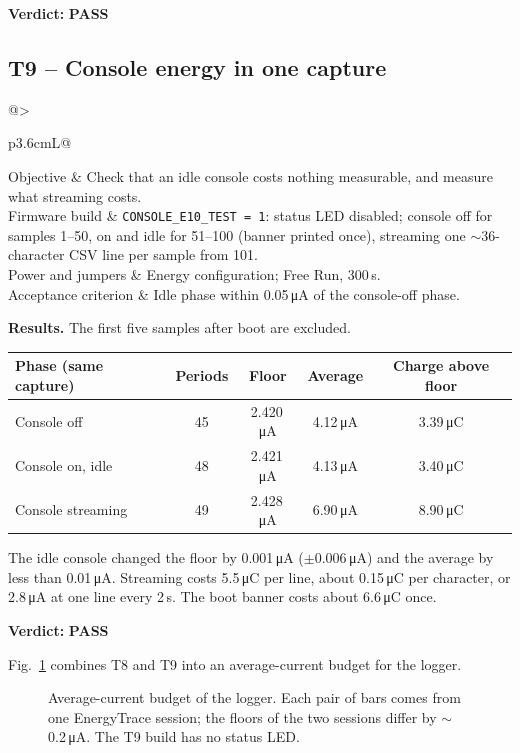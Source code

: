 \documentclass[11pt,a4paper]{article}
\makeatletter
\newcommand{\uA}{\,\si{\micro\ampere}}
\newcommand{\uC}{\,\si{\micro\coulomb}}
\newcommand{\code}[1]{\texttt{#1}}
\newcommand{\pass}{\textbf{\textcolor{green!45!black}{PASS}}}
\newcommand{\testcase}[7]{%
  \subsection{#1 -- #2}\label{#3}
  \noindent\begin{tabularx}{\textwidth}{@{}>{\raggedright\arraybackslash\bfseries}p{3.6cm}L@{}}
  \toprule
  Objective & #4 \\
  Firmware build & #5 \\
  Power and jumpers & #6 \\
  Acceptance criterion & #7 \\
  \bottomrule
  \end{tabularx}\par\medskip}
\makeatother
\begin{document}
\textbf{Verdict:} \pass

\testcase{T9}{Console energy in one capture}{t:console}
  {Check that an idle console costs nothing measurable, and measure what streaming costs.}
  {\code{CONSOLE\_E10\_TEST = 1}: status LED disabled; console off for samples 1--50, on and idle for 51--100 (banner printed once), streaming one $\sim$36-character CSV line per sample from 101.}
  {Energy configuration; Free Run, 300\,s.}
  {Idle phase within 0.05\uA{} of the console-off phase.}

\textbf{Results.} The first five samples after boot are excluded.
\begin{table}[H]
\centering\small
\begin{tabular}{@{}lcccc@{}}
\toprule
Phase (same capture) & Periods & Floor & Average & Charge above floor \\
\midrule
Console off & 45 & 2.420\uA & 4.12\uA & 3.39\uC \\
Console on, idle & 48 & 2.421\uA & 4.13\uA & 3.40\uC \\
Console streaming & 49 & 2.428\uA & 6.90\uA & 8.90\uC \\
\bottomrule
\end{tabular}
\end{table}
The idle console changed the floor by 0.001\uA{} ($\pm$0.006\uA) and the average by less than 0.01\uA. Streaming costs 5.5\uC{} per line, about 0.15\uC{} per character, or 2.8\uA{} at one line every 2\,s. The boot banner costs about 6.6\uC{} once.

\textbf{Verdict:} \pass

Fig.~\ref{fig:budget} combines T8 and T9 into an average-current budget for the logger.

\begin{figure}[tbp]
\centering
{}
\caption{Average-current budget of the logger. Each pair of bars comes from one EnergyTrace session; the floors of the two sessions differ by $\sim$0.2\uA. The T9 build has no status LED.}
\label{fig:budget}
\end{figure}
\end{document}
